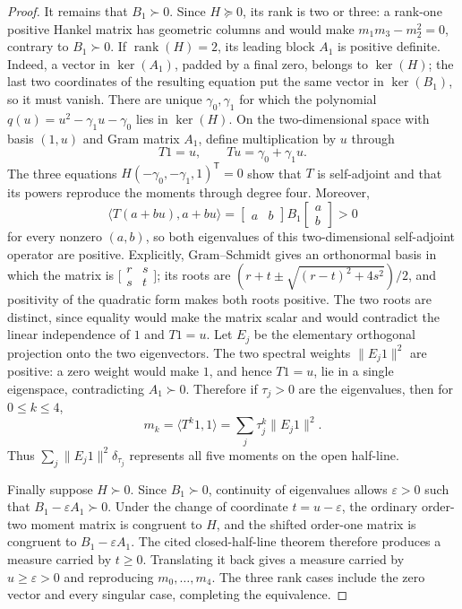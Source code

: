 \documentclass{article}
\begin{document}
\begin{proof}
It remains that \(B_1\succ0\).  Since \(H\succeq0\), its rank is two or
three: a rank-one positive Hankel matrix has geometric columns and would make
\(m_1m_3-m_2^2=0\), contrary to \(B_1\succ0\).  If
\(\operatorname{rank}(H)=2\), its leading block \(A_1\) is positive definite.
Indeed, a vector in \(\ker(A_1)\), padded by a final zero, belongs to
\(\ker(H)\); the last two coordinates of the resulting equation put the same
vector in \(\ker(B_1)\), so it must vanish.  There are unique
\(\gamma_0,\gamma_1\) for which the polynomial
\(q(u)=u^2-\gamma_1u-\gamma_0\) lies in \(\ker(H)\).  On the two-dimensional
space with basis \((1,u)\) and Gram matrix \(A_1\), define multiplication by
\(u\) through
\[
 T1=u,\qquad Tu=\gamma_0+\gamma_1u.
\]
The three equations \(H(-\gamma_0,-\gamma_1,1)^{\mathsf T}=0\) show that
\(T\) is self-adjoint and that its powers reproduce the moments through
degree four.  Moreover,
\[
 \langle T(a+bu),a+bu\rangle
 =\begin{bmatrix}a&b\end{bmatrix}B_1
   \begin{bmatrix}a\\b\end{bmatrix}>0
\]
for every nonzero \((a,b)\), so both eigenvalues of this two-dimensional
self-adjoint operator are positive.  Explicitly, Gram--Schmidt gives an
orthonormal basis in which the matrix is
\(\bigl[\begin{smallmatrix}r&s\\s&t\end{smallmatrix}\bigr]\); its roots are
\((r+t\pm\sqrt{(r-t)^2+4s^2})/2\), and positivity of the quadratic form makes
both roots positive.  The two roots are distinct, since equality would make
the matrix scalar and would contradict the linear independence of \(1\) and
\(T1=u\).  Let \(E_j\) be the elementary orthogonal projection onto the two
eigenvectors.  The two spectral weights
\(\|E_j1\|^2\) are positive: a zero weight would make \(1\), and hence
\(T1=u\), lie in a single eigenspace, contradicting \(A_1\succ0\).  Therefore
if \(\tau_j>0\) are the eigenvalues, then for \(0\le k\le4\),
\[
 m_k=\langle T^k1,1\rangle
 =\sum_j\tau_j^k\|E_j1\|^2.
\]
Thus \(\sum_j\|E_j1\|^2\delta_{\tau_j}\) represents all five moments on the
open half-line.

Finally suppose \(H\succ0\).  Since \(B_1\succ0\), continuity of eigenvalues
allows \(\varepsilon>0\) such that
\(B_1-\varepsilon A_1\succ0\).  Under the change of coordinate
\(t=u-\varepsilon\), the ordinary order-two moment matrix is congruent to
\(H\), and the shifted order-one matrix is congruent to
\(B_1-\varepsilon A_1\).  The cited closed-half-line theorem therefore
produces a measure carried by \(t\ge0\).  Translating it back gives a measure
carried by \(u\ge\varepsilon>0\) and reproducing \(m_0,\ldots,m_4\).  The
three rank cases include the zero vector and every singular case, completing
the equivalence.
\end{proof}
\end{document}

